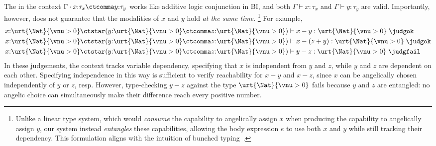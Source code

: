 The \ctcomma in the context
$\Gamma \cdot x{:}\tau_x \ctcomma y{:}\tau_y$ works like additive
logic conjunction in BI, and both $\Gamma \vdash x{:}\tau_x$ and
$\Gamma \vdash y{:}\tau_y$ are valid. Importantly, however, does not
guarantee that the modalities of $x$ and $y$ hold \emph{at the same
  time}. \footnote{Unlike a linear type system, which would
  \emph{consume} the capability to angelically assign $x$ when
  producing the capability to angelically assign $y$, our system
  instead \emph{entangles} these capabilities, allowing the body
  expression $e$ to use both $x$ and $y$ while still tracking their
  dependency. This formulation aligns with the intuition of bunched
  typing~\cite{BunchedType}. }  For example,
\begin{align*}
  &x{:}\urt{\Nat}{\vnu > 0} \ctstar (y{:}\urt{\Nat}{\vnu > 0} \ctcomma z{:}\urt{\Nat}{\vnu > 0}) \vdash x - y : \urt{\Nat}{\vnu > 0} \;\judgok
  \\&x{:}\urt{\Nat}{\vnu > 0} \ctstar (y{:}\urt{\Nat}{\vnu > 0}
  \ctcomma z{:}\urt{\Nat}{\vnu > 0}) \vdash x - (z + y) : \urt{\Nat}{\vnu > 0} \;\judgok
  \\&x{:}\urt{\Nat}{\vnu > 0} \ctstar (y{:}\urt{\Nat}{\vnu > 0} \ctcomma z{:}\urt{\Nat}{\vnu > 0}) \vdash y - z : \urt{\Nat}{\vnu > 0} \;\judgfail
\end{align*}\noindent
In these judgements, the context tracks variable dependency,
specifying that $x$ is independent from $y$ and $z$, while $y$ and $z$
are dependent on each other.  Specifying independence in this way is
sufficient to verify reachability for $x - y$ and $x - z$, since $x$
can be angelically chosen independently of $y$ or $z$, resp.  However,
type-checking $y - z$ against the type $\urt{\Nat}{\vnu > 0}$ fails
because $y$ and $z$ are entangled: no angelic choice can
simultaneously make their difference reach every positive number.

